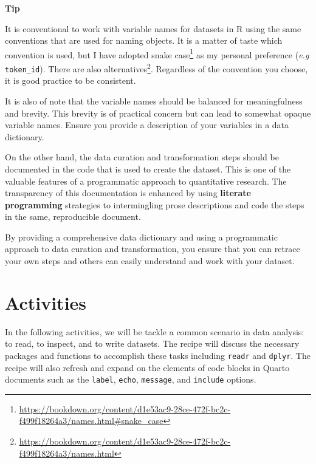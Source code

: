\documentclass[
  letterpaper,
]{latex/krantz}
\theoremstyle{definition}
\theoremstyle{remark}
\DeclareRobustCommand{\href}[2]{#2\footnote{\url{#1}}}
\begin{document}
\begin{tcolorbox}[enhanced jigsaw, colframe=quarto-callout-color-frame, breakable, bottomrule=.15mm, arc=.35mm, left=2mm, opacityback=0, rightrule=.15mm, colback=white, toprule=.15mm, leftrule=.75mm]

\textbf{ Tip}

It is conventional to work with variable names for datasets in R using
the same conventions that are used for naming objects. It is a matter of
taste which convention is used, but I have adopted
\href{https://bookdown.org/content/d1e53ac9-28ce-472f-bc2c-f499f18264a3/names.html\#snake_case}{snake
case} as my personal preference (\emph{e.g} \texttt{token\_id}). There
are also
\href{https://bookdown.org/content/d1e53ac9-28ce-472f-bc2c-f499f18264a3/names.html}{alternatives}.
Regardless of the convention you choose, it is good practice to be
consistent.

It is also of note that the variable names should be balanced for
meaningfulness and brevity. This brevity is of practical concern but can
lead to somewhat opaque variable names. Ensure you provide a description
of your variables in a data dictionary.

\end{tcolorbox}

On the other hand, the data curation and transformation steps should be
documented in the code that is used to create the dataset. This is one
of the valuable features of a programmatic approach to quantitative
research. The transparency of this documentation is enhanced by using
\textbf{literate programming} strategies to intermingling prose
descriptions and code the steps in the same, reproducible document.

By providing a comprehensive data dictionary and using a programmatic
approach to data curation and transformation, you ensure that you can
retrace your own steps and others can easily understand and work with
your dataset.

\section*{Activities}\label{activities}


In the following activities, we will be tackle a common scenario in data
analysis: to read, to inspect, and to write datasets. The recipe will
discuss the necessary packages and functions to accomplish these tasks
including \texttt{readr} and \texttt{dplyr}. The recipe will also
refresh and expand on the elements of code blocks in Quarto documents
such as the \texttt{label}, \texttt{echo}, \texttt{message}, and
\texttt{include} options.
\end{document}
